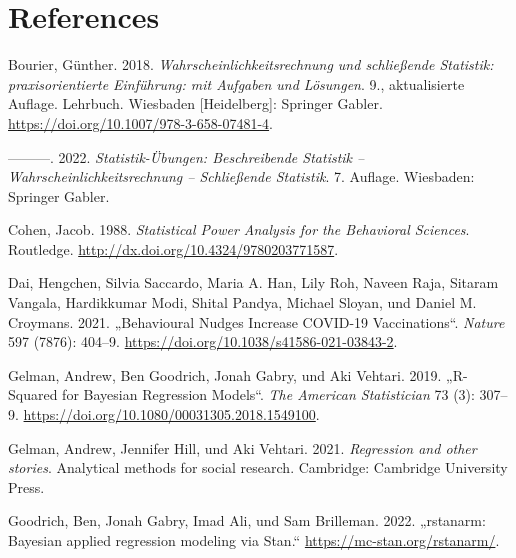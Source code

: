 \documentclass[
  a4paper,
  DIV=11]{scrreprt}
\newlength{\cslhangindent}
\newlength{\cslentryspacingunit} %
\newenvironment{CSLReferences}[2] %
 {%
  \setlength{\parindent}{0pt}
  \ifodd #1
  \let\oldpar\par
  \def\par{\hangindent=\cslhangindent\oldpar}
  \fi
  \setlength{\parskip}{#2\cslentryspacingunit}
 }%
 {}
\theoremstyle{definition}
\theoremstyle{remark}
\begin{document}

\hypertarget{references}{%
\chapter*{References}\label{references}}


\hypertarget{refs}{}
\begin{CSLReferences}{1}{0}
\leavevmode{}%
Bourier, Günther. 2018. \emph{Wahrscheinlichkeitsrechnung und
schließende Statistik: praxisorientierte Einführung: mit Aufgaben und
Lösungen}. 9., aktualisierte Auflage. Lehrbuch. Wiesbaden
{[}Heidelberg{]}: Springer Gabler.
\url{https://doi.org/10.1007/978-3-658-07481-4}.

\leavevmode{}%
---------. 2022. \emph{Statistik-Übungen: Beschreibende Statistik --
Wahrscheinlichkeitsrechnung -- Schließende Statistik}. 7. Auflage.
Wiesbaden: Springer Gabler.

\leavevmode{}%
Cohen, Jacob. 1988. \emph{Statistical Power Analysis for the Behavioral
Sciences}. Routledge. \url{http://dx.doi.org/10.4324/9780203771587}.

\leavevmode{}%
Dai, Hengchen, Silvia Saccardo, Maria A. Han, Lily Roh, Naveen Raja,
Sitaram Vangala, Hardikkumar Modi, Shital Pandya, Michael Sloyan, und
Daniel M. Croymans. 2021. {„Behavioural Nudges Increase {COVID}-19
Vaccinations``}. \emph{Nature} 597 (7876): 404--9.
\url{https://doi.org/10.1038/s41586-021-03843-2}.

\leavevmode{}%
Gelman, Andrew, Ben Goodrich, Jonah Gabry, und Aki Vehtari. 2019.
{„R-Squared for Bayesian Regression Models``}. \emph{The American
Statistician} 73 (3): 307--9.
\url{https://doi.org/10.1080/00031305.2018.1549100}.

\leavevmode{}%
Gelman, Andrew, Jennifer Hill, und Aki Vehtari. 2021. \emph{Regression
and other stories}. Analytical methods for social research. Cambridge:
Cambridge University Press.

\leavevmode{}%
Goodrich, Ben, Jonah Gabry, Imad Ali, und Sam Brilleman. 2022.
{„rstanarm: {Bayesian} applied regression modeling via {Stan}.``}
\url{https://mc-stan.org/rstanarm/}.


\end{CSLReferences}
\end{document}
